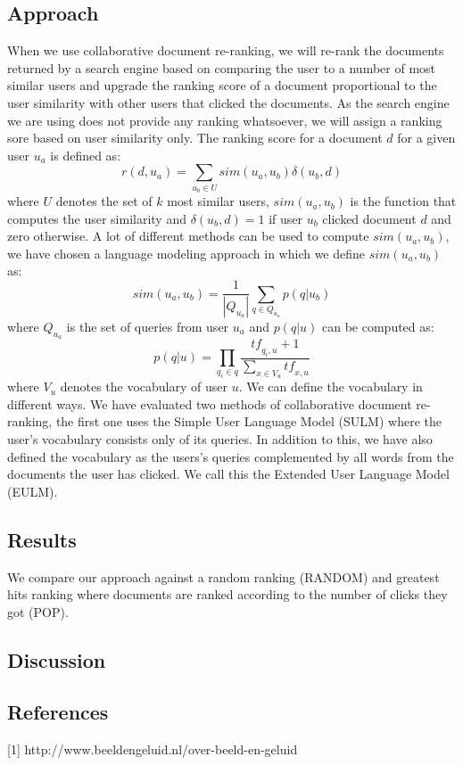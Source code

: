 \documentclass[12pt]{amsart}
\begin{document}
\subsection{Approach}
When we use collaborative document re-ranking, we will re-rank the documents returned by a search engine based on comparing the user to a number of most similar users and upgrade the ranking score of a document proportional to the user similarity with other users that clicked the documents. As the search engine we are using does not provide any ranking whatsoever, we will assign a ranking sore based on user similarity only. The ranking score for a document $d$ for a given user $u_a$ is defined as: 
$$r(d, u_a) = \sum\limits_{u_b \in U}\textit{sim}(u_a, u_b)\delta(u_b, d)$$
where $U$ denotes the set of $k$ most similar users, $\textit{sim}(u_a, u_b)$ is the function that computes the user similarity and $\delta(u_b, d) = 1$ if user $u_b$ clicked document $d$ and zero otherwise. A lot of different methods can be used to compute $\textit{sim}(u_a, u_b)$, we have chosen a language modeling approach in which we define $\textit{sim}(u_a, u_b)$ as:
$$ \textit{sim}(u_a, u_b) = \frac{1}{|Q_{u_a}|}\sum\limits_{q \in Q_{u_a}} p(q|u_b)$$
where $Q_{u_a}$ is the set of queries from user $u_a$ and $p(q|u)$ can be computed as:
$$p(q|u) = \prod\limits_{q_i \in q} \frac{\textit{tf}_{q_i, u}+1}{\sum\limits_{x \in V_u} \textit{tf}_{x, u}}$$
where $V_u$ denotes the vocabulary of user $u$. We can define the vocabulary in different ways. We have evaluated two methods of collaborative document re-ranking, the first one uses the Simple User Language Model (SULM) where the user's vocabulary consists only of its queries. In addition to this, we have also defined the vocabulary as the users's queries complemented by all words from the documents the user has clicked. We call this the Extended User Language Model (EULM).
\subsection{Results}
We compare our approach against a random ranking (RANDOM) and greatest hits ranking where documents are ranked according to the number of clicks they got (POP).
\subsection{Discussion}

\subsection{References}
[1] http://www.beeldengeluid.nl/over-beeld-en-geluid
\end{document}
